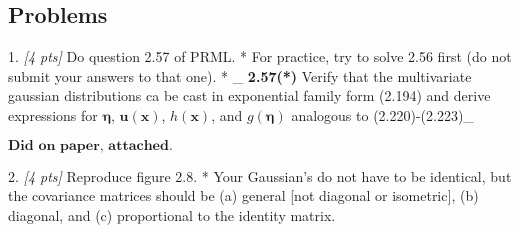 \documentclass[11pt]{article}
\begin{document}
    \hypertarget{problems}{%
\subsection{Problems}\label{problems}}

    1. \emph{{[}4 pts{]}} Do question 2.57 of PRML. * For practice, try to
solve 2.56 first (do not submit your answers to that one). * \_
\textbf{2.57(*)} Verify that the multivariate gaussian distributions ca
be cast in exponential family form (2.194) and derive expressions for
\(\boldsymbol{\eta}\), \(\mathbf{u}(\mathbf{x})\), \(h(\mathbf{x})\),
and \(g(\boldsymbol{\eta})\) analogous to (2.220)-(2.223)\_

    \(\textbf{Did on paper, attached.}\)

    2. \emph{{[}4 pts{]}} Reproduce figure 2.8. * Your Gaussian's do not
have to be identical, but the covariance matrices should be (a) general
{[}not diagonal or isometric{]}, (b) diagonal, and (c) proportional to
the identity matrix.
\end{document}
